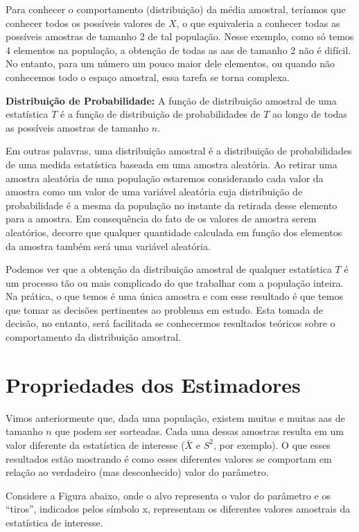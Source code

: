\documentclass[
]{book}
\begin{document}
Para conhecer o comportamento (distribuição) da média amostral, teríamos que conhecer todos os possíveis valores de \(X\), o que equivaleria a conhecer todas as possíveis amostras de tamanho 2 de tal população. Nesse exemplo, como só temos 4 elementos na população, a obtenção de todas as aas de tamanho 2 não é difícil. No entanto, para um número um pouco maior dele elementos, ou quando não conhecemos todo o espaço amostral, essa tarefa se torna complexa.

\textbf{Distribuição de Probabilidade:} A função de distribuição amostral de uma estatística \(T\) é a função de distribuição de probabilidades de \(T\) ao longo de todas as possíveis amostras de tamanho \(n\).

Em outras palavras, uma distribuição amostral é a distribuição de probabilidades de uma medida estatística baseada em uma amostra aleatória. Ao retirar uma amostra aleatória de uma população estaremos considerando cada valor da amostra como um valor de uma variável aleatória cuja distribuição de probabilidade é a mesma da população no instante da retirada desse elemento para a amostra. Em consequência do fato de os valores de amostra serem aleatórios, decorre que qualquer quantidade calculada em função dos elementos da amostra também será uma variável aleatória.

Podemos ver que a obtenção da distribuição amostral de qualquer estatística \(T\) é um processo tão ou mais complicado do que trabalhar com a população inteira. Na prática, o que temos é uma única amostra e com esse resultado é que temos que tomar as decisões pertinentes ao problema em estudo. Esta tomada de decisão, no entanto, será facilitada se conhecermos resultados teóricos sobre o comportamento da distribuição amostral.

\hypertarget{propriedades-dos-estimadores}{%
\section{Propriedades dos Estimadores}\label{propriedades-dos-estimadores}}

Vimos anteriormente que, dada uma população, existem muitas e muitas aas de tamanho \(n\) que podem ser sorteadas. Cada uma dessas amostras resulta em um valor diferente da estatística de interesse (\(\bar X\) e \(S^2\), por exemplo). O que esses resultados estão mostrando é como esses diferentes valores se comportam em relação ao verdadeiro (mas desconhecido) valor do parâmetro.

Considere a Figura abaixo, onde o alvo representa o valor do parâmetro e os ``tiros'', indicados pelos símbolo x, representam os diferentes valores amostrais da estatística de interesse.
\end{document}
